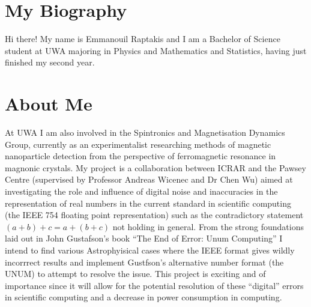 \section{My Biography}
Hi there! My name is Emmanouil Raptakis and I am a Bachelor of Science student at UWA majoring in Physics and Mathematics and Statistics, having just finished my second year. 

\section{About Me}
At UWA I am also involved in the Spintronics and Magnetisation Dynamics Group, currently as an experimentalist researching methods of magnetic nanoparticle detection from the perspective of ferromagnetic resonance in magnonic crystals. My project is a collaboration between ICRAR and the Pawsey Centre (supervised by Professor Andreas Wicenec and Dr Chen Wu) aimed at investigating the role and influence of digital noise and inaccuracies in the representation of real numbers in the current standard in scientific computing (the IEEE 754 floating point representation) such as the contradictory statement $(a+b)+c = a+(b+c)$ not holding in general. From the strong foundations laid out in John Gustafson's book ``The End of Error: Unum Computing'' I intend to find various Astrophyisical cases where the IEEE format gives wildly incorrrect results and implement Gustfson's alternative number format (the UNUM) to attempt to resolve the issue. This project is exciting and of importance since it will allow for the potential resolution of these ``digital'' errors in scientific computing and a decrease in power consumption in computing.